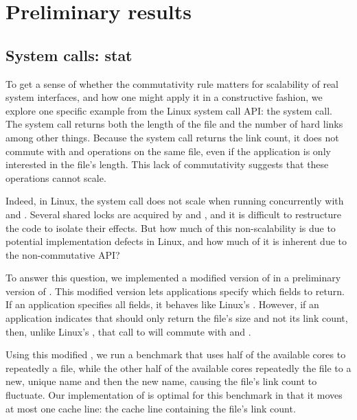 \section{Preliminary results}
\label{s:prelim}



\subsection{System calls: stat}


To get a sense of whether the commutativity rule matters for scalability
of real system interfaces, and how one might apply it in a constructive
fashion, we explore one specific example from the Linux system call API:
the  system call.  The  system call returns both the
length of the file and the number of hard links among other things.
Because the 
system call returns the link count, it does not commute with
 and  operations on the same file, even if
the application is only interested in the file's length. This lack of
commutativity suggests that these operations cannot scale.

Indeed, in Linux, the  system call does not scale when running
concurrently with  and .
Several shared locks are acquired by  and , and
it is difficult to restructure the code to isolate their effects.  But
how much of this non-scalability is due to potential implementation
defects in Linux, and how much of it is inherent due to the non-commutative
API?

To answer this question, we implemented a modified version of
 in a preliminary version of \sys.  This
modified version lets applications specify which fields to return.  If
an application specifies all fields, it behaves like Linux's
.  However, if an application indicates that 
should only return the file's size and not its link count, then,
unlike Linux's , that call to  will commute with
 and .

Using this modified , we run a benchmark that uses half of
the available cores to repeatedly  a file, while the other
half of the available cores repeatedly  the file to a new,
unique name and then  the new name, causing the file's
link count to fluctuate.  Our implementation of  is optimal
for this benchmark in that it moves at most one cache line: the cache
line containing the file's link count.

